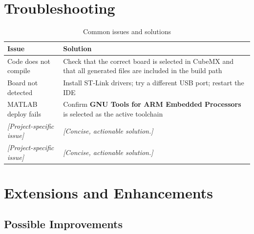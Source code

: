 \section{Troubleshooting}

\begin{table}[H]
    \centering
    \caption{Common issues and solutions}
    \label{tab:troubleshooting}
    \begin{tabularx}{\textwidth}{|l|X|}
        \hline
        \textbf{Issue} & \textbf{Solution} \\
        \hline
        Code does not compile &
            Check that the correct board is selected in CubeMX and
            that all generated files are included in the build path \\
        \hline
        Board not detected &
            Install ST-Link drivers; try a different USB port;
            restart the IDE \\
        \hline
        MATLAB deploy fails &
            Confirm \textbf{GNU Tools for ARM Embedded Processors}
            is selected as the active toolchain \\
        \hline
        \textit{[Project-specific issue]} &
            \textit{[Concise, actionable solution.]} \\
        \hline
        \textit{[Project-specific issue]} &
            \textit{[Concise, actionable solution.]} \\
        \hline
    \end{tabularx}
\end{table}

\section{Extensions and Enhancements}

\subsection{Possible Improvements}

